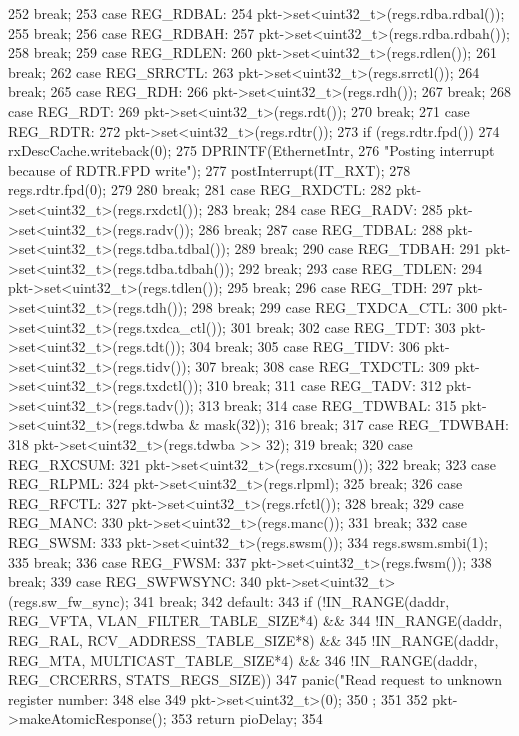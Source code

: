 \begin{DoxyCode}
{{252         break;
253       case REG_RDBAL:
254         pkt->set<uint32_t>(regs.rdba.rdbal());
255         break;
256       case REG_RDBAH:
257         pkt->set<uint32_t>(regs.rdba.rdbah());
258         break;
259       case REG_RDLEN:
260         pkt->set<uint32_t>(regs.rdlen());
261         break;
262       case REG_SRRCTL:
263         pkt->set<uint32_t>(regs.srrctl());
264         break;
265       case REG_RDH:
266         pkt->set<uint32_t>(regs.rdh());
267         break;
268       case REG_RDT:
269         pkt->set<uint32_t>(regs.rdt());
270         break;
271       case REG_RDTR:
272         pkt->set<uint32_t>(regs.rdtr());
273         if (regs.rdtr.fpd()) {
274             rxDescCache.writeback(0);
275             DPRINTF(EthernetIntr,
276                     "Posting interrupt because of RDTR.FPD write\n");
277             postInterrupt(IT_RXT);
278             regs.rdtr.fpd(0);
279         }
280         break;
281       case REG_RXDCTL:
282         pkt->set<uint32_t>(regs.rxdctl());
283         break;
284       case REG_RADV:
285         pkt->set<uint32_t>(regs.radv());
286         break;
287       case REG_TDBAL:
288         pkt->set<uint32_t>(regs.tdba.tdbal());
289         break;
290       case REG_TDBAH:
291         pkt->set<uint32_t>(regs.tdba.tdbah());
292         break;
293       case REG_TDLEN:
294         pkt->set<uint32_t>(regs.tdlen());
295         break;
296       case REG_TDH:
297         pkt->set<uint32_t>(regs.tdh());
298         break;
299       case REG_TXDCA_CTL:
300         pkt->set<uint32_t>(regs.txdca_ctl());
301         break;
302       case REG_TDT:
303         pkt->set<uint32_t>(regs.tdt());
304         break;
305       case REG_TIDV:
306         pkt->set<uint32_t>(regs.tidv());
307         break;
308       case REG_TXDCTL:
309         pkt->set<uint32_t>(regs.txdctl());
310         break;
311       case REG_TADV:
312         pkt->set<uint32_t>(regs.tadv());
313         break;
314       case REG_TDWBAL:
315         pkt->set<uint32_t>(regs.tdwba & mask(32));
316         break;
317       case REG_TDWBAH:
318         pkt->set<uint32_t>(regs.tdwba >> 32);
319         break;
320       case REG_RXCSUM:
321         pkt->set<uint32_t>(regs.rxcsum());
322         break;
323       case REG_RLPML:
324         pkt->set<uint32_t>(regs.rlpml);
325         break;
326       case REG_RFCTL:
327         pkt->set<uint32_t>(regs.rfctl());
328         break;
329       case REG_MANC:
330         pkt->set<uint32_t>(regs.manc());
331         break;
332       case REG_SWSM:
333         pkt->set<uint32_t>(regs.swsm());
334         regs.swsm.smbi(1);
335         break;
336       case REG_FWSM:
337         pkt->set<uint32_t>(regs.fwsm());
338         break;
339       case REG_SWFWSYNC:
340         pkt->set<uint32_t>(regs.sw_fw_sync);
341         break;
342       default:
343         if (!IN_RANGE(daddr, REG_VFTA, VLAN_FILTER_TABLE_SIZE*4) &&
344             !IN_RANGE(daddr, REG_RAL, RCV_ADDRESS_TABLE_SIZE*8) &&
345             !IN_RANGE(daddr, REG_MTA, MULTICAST_TABLE_SIZE*4) &&
346             !IN_RANGE(daddr, REG_CRCERRS, STATS_REGS_SIZE))
347             panic("Read request to unknown register number: %
348         else
349             pkt->set<uint32_t>(0);
350     };
351 
352     pkt->makeAtomicResponse();
353     return pioDelay;
354 }
\end{DoxyCode}
